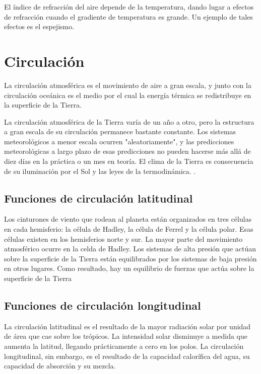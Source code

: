 \documentclass{article} %
\begin{document}
El índice de refracción del aire depende de la temperatura, dando lugar a efectos de refracción cuando el gradiente de temperatura es grande. Un ejemplo de tales efectos es el espejismo.


\section{Circulación}

La circulación atmosférica es el movimiento de aire a gran escala, y junto con la circulación oceánica es el medio por el cual la energía térmica se redistribuye en la superficie de la Tierra.

La circulación atmosférica de la Tierra varía de un año a otro, pero la estructura a gran escala de su circulación permanece bastante constante. Los sistemas meteorológicos a menor escala ocurren "aleatoriamente", y las predicciones meteorológicas a largo plazo de esas predicciones no pueden hacerse más allá de diez días en la práctica o un mes en teoría. El clima de la Tierra es consecuencia de su iluminación por el Sol y las leyes de la termodinámica. .


\subsection{Funciones de circulación latitudinal}

Los cinturones de viento que rodean al planeta están organizados en tres células en cada hemisferio: la célula de Hadley, la célula de Ferrel y la célula polar. Esas células existen en los hemisferios norte y sur. La mayor parte del movimiento atmosférico ocurre en la celda de Hadley. Los sistemas de alta presión que actúan sobre la superficie de la Tierra están equilibrados por los sistemas de baja presión en otros lugares. Como resultado, hay un equilibrio de fuerzas que actúa sobre la superficie de la Tierra


\subsection{Funciones de circulación longitudinal}

La circulación latitudinal es el resultado de la mayor radiación solar por unidad de área que cae sobre los trópicos. La intensidad solar disminuye a medida que aumenta la latitud, llegando prácticamente a cero en los polos. La circulación longitudinal, sin embargo, es el resultado de la capacidad calorífica del agua, su capacidad de absorción y su mezcla.
\end{document}
